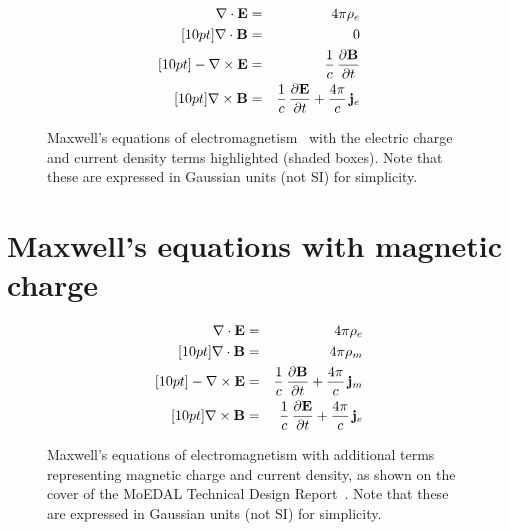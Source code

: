 \documentclass[12pt,a4paper]{iopart}
\begin{document}
\begin{figure}[htbp]
  \centering
\begin{eqnarray}
\label{eq:1} \mathbf{\nabla} \cdot \mathbf{E} & = & 4 \pi \rho_{e}\\ [10pt]
\label{eq:2} \mathbf{\nabla} \cdot \mathbf{B} & = & 0\\ [10pt]
\label{eq:3} - \mathbf{\nabla} \times \mathbf{E} & = & \frac{1}{c} \, \frac{\partial \mathbf{B}}{\partial t}\\ [10pt]
\label{eq:4}   \mathbf{\nabla} \times \mathbf{B} & = & \frac{1}{c} \, \frac{\partial \mathbf{E}}{\partial t} + \frac{4 \pi}{c} \, \mathbf{j}_{e}
\end{eqnarray}
  \caption[Maxwell's equations of electromagnetism.]
  {\label{fig:maxwellseqs}Maxwell's equations of electromagnetism~\cite{Maxwell1865} with the electric charge and current density terms highlighted (shaded boxes). Note that these are expressed in Gaussian units (not SI) for simplicity.}
\end{figure}

\section{Maxwell's equations with magnetic charge}

\begin{figure}[htbp]
  \centering
\begin{eqnarray}
\label{eq:1m} \mathbf{\nabla} \cdot \mathbf{E} & = & 4 \pi \rho_{e}\\ [10pt]
\label{eq:2m} \mathbf{\nabla} \cdot \mathbf{B} & = & 4 \pi \rho_{m}\\ [10pt]
\label{eq:3m} - \mathbf{\nabla} \times \mathbf{E} & = & \frac{1}{c} \, \frac{\partial \mathbf{B}}{\partial t} + \frac{4 \pi}{c} \, \mathbf{j}_{m}\\ [10pt]
\label{eq:4m}   \mathbf{\nabla} \times \mathbf{B} & = & \frac{1}{c} \, \frac{\partial \mathbf{E}}{\partial t} + \frac{4 \pi}{c} \, \mathbf{j}_{e}
\end{eqnarray}
  \caption[Maxwell's equations of electromagnetism with magnetic charge.]
  {\label{fig:maxwellseqsmagcharge}Maxwell's equations of electromagnetism with additional terms representing magnetic charge and current density, as shown on the cover of the MoEDAL Technical Design Report~\cite{MoEDAL2009}. Note that these are expressed in Gaussian units (not SI) for simplicity.}
\end{figure}
\end{document}
